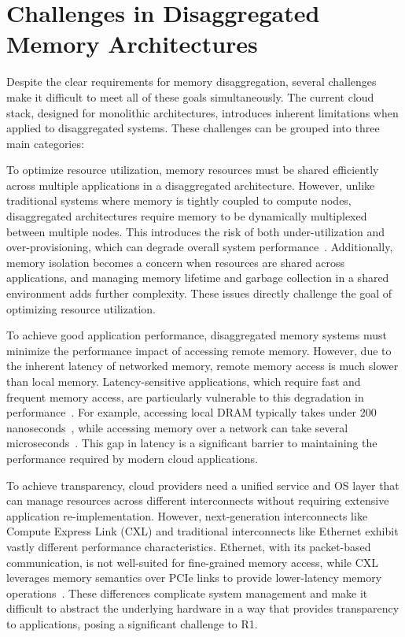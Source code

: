 \section{Challenges in Disaggregated Memory Architectures}

Despite the clear requirements for memory disaggregation, several challenges make it difficult to meet all of these goals simultaneously. The current cloud stack, designed for monolithic architectures, introduces inherent limitations when applied to disaggregated systems. These challenges can be grouped into three main categories:


To optimize resource utilization, memory resources must be shared efficiently across multiple applications in a disaggregated architecture. However, unlike traditional systems where memory is tightly coupled to compute nodes, disaggregated architectures require memory to be dynamically multiplexed between multiple nodes. This introduces the risk of both under-utilization and over-provisioning, which can degrade overall system performance~\cite{jiffy, pocket}. Additionally, memory isolation becomes a concern when resources are shared across applications, and managing memory lifetime and garbage collection in a shared environment adds further complexity. These issues directly challenge the goal of optimizing resource utilization.


To achieve good application performance, disaggregated memory systems must minimize the performance impact of accessing remote memory. However, due to the inherent latency of networked memory, remote memory access is much slower than local memory. Latency-sensitive applications, which require fast and frequent memory access, are particularly vulnerable to this degradation in performance~\cite{mind, chase}. For example, accessing local DRAM typically takes under 200 nanoseconds~\cite{cxl1, cxl2}, while accessing memory over a network can take several microseconds~\cite{mind,infiniswap}. This gap in latency is a significant barrier to maintaining the performance required by modern cloud applications.


To achieve transparency, cloud providers need a unified service and OS layer that can manage resources across different interconnects without requiring extensive application re-implementation. However, next-generation interconnects like Compute Express Link (CXL) and traditional interconnects like Ethernet exhibit vastly different performance characteristics. Ethernet, with its packet-based communication, is not well-suited for fine-grained memory access, while CXL leverages memory semantics over PCIe links to provide lower-latency memory operations~\cite{cxl1, cxl2, demystify}. These differences complicate system management and make it difficult to abstract the underlying hardware in a way that provides transparency to applications, posing a significant challenge to R1.


